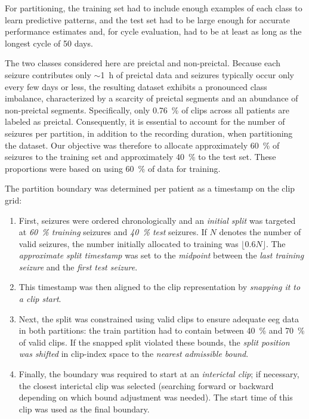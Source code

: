 For partitioning, the training set had to include enough examples of each class to learn predictive patterns, and
the test set had to be large enough for accurate performance estimates and, for cycle evaluation, had to be at least as long as the longest cycle of 50 days.

The two classes considered here are preictal and non-preictal.
Because each seizure contributes only $\sim$\SI{1}{\hour} of preictal data and seizures typically occur only every few days or less, the resulting dataset exhibits a pronounced class imbalance, characterized by a scarcity of preictal segments and an abundance of non-preictal segments.
Specifically, only \SI{0.76}{\percent} of clips across all patients are labeled as preictal.
Consequently, it is essential to account for the number of seizures per partition, in addition to the recording duration, when partitioning the dataset.
Our objective was therefore to allocate approximately \SI{60}{\percent} of seizures to the training set and approximately \SI{40}{\percent} to the test set.
These proportions were based on \textcite{yang_seizure_2024} using \SI{60}{\percent} of data for training.

The partition boundary was determined per patient as a timestamp on the clip grid:
\begin{enumerate}
    \item 
    First, seizures were ordered chronologically and an \textit{initial split} was targeted at \textit{\SI{60}{\percent} training} seizures and \textit{\SI{40}{\percent} test} seizures.
    If $N$ denotes the number of valid seizures, the number initially allocated to training was $\lfloor 0.6N \rfloor$. The \textit{approximate split timestamp} was set to the \textit{midpoint} between the \textit{last training seizure} and the \textit{first test seizure}.
    \item 
    This timestamp was then aligned to the clip representation by \textit{snapping it to a clip start}.
    \item
    Next, the split was constrained using valid clips to ensure adequate \gls{eeg} data in both partitions: the train partition had to contain between \SI{40}{\percent} and \SI{70}{\percent} of valid clips.
    If the snapped split violated these bounds, the \textit{split position was shifted} in clip-index space to the \textit{nearest admissible bound}.
    \item
    Finally, the boundary was required to start at an \textit{interictal clip}; if necessary, the closest interictal clip was selected (searching forward or backward depending on which bound adjustment was needed).
    The start time of this clip was used as the final boundary.
\end{enumerate}

